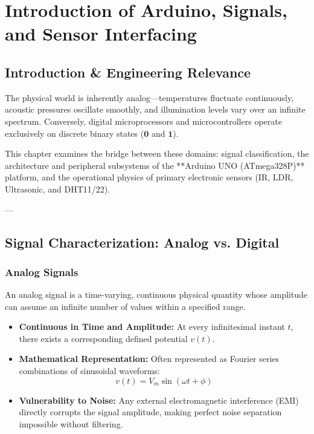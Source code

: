 \chapter{Introduction of Arduino, Signals, and Sensor Interfacing}
\label{chap:arduino-sensors}

\section{Introduction \& Engineering Relevance}
The physical world is inherently analog—temperatures fluctuate continuously, acoustic pressures oscillate smoothly, and illumination levels vary over an infinite spectrum. Conversely, digital microprocessors and microcontrollers operate exclusively on discrete binary states ($\mathbf{0}$ and $\mathbf{1}$). 

\noindent This chapter examines the bridge between these domains: signal classification, the architecture and peripheral subsystems of the **Arduino UNO (ATmega328P)** platform, and the operational physics of primary electronic sensors (IR, LDR, Ultrasonic, and DHT11/22).

---

\section{Signal Characterization: Analog vs. Digital}

\subsection{Analog Signals}
An analog signal is a time-varying, continuous physical quantity whose amplitude can assume an infinite number of values within a specified range.
\begin{itemize}
    \item \textbf{Continuous in Time and Amplitude:} At every infinitesimal instant $t$, there exists a corresponding defined potential $v(t)$.
    \item \textbf{Mathematical Representation:} Often represented as Fourier series combinations of sinusoidal waveforms:
    \begin{equation}
        v(t) = V_m \sin(\omega t + \phi)
    \end{equation}
    \item \textbf{Vulnerability to Noise:} Any external electromagnetic interference (EMI) directly corrupts the signal amplitude, making perfect noise separation impossible without filtering.
\end{itemize}

